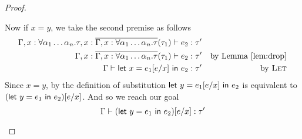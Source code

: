 \begin{proof}
\begin{description}
    Now if $x = y$, we take the second premise as follows
    \begin{align*}
      \Gamma , x : \forall \alpha_1\ldots\alpha_n . \tau , x : \overline{\Gamma, x : \forall\alpha_1\ldots\alpha_n . \tau}(\tau_1)
      \vdash e_2 : \tau' \\
      \Gamma , x : \overline{\Gamma, x : \forall\alpha_1\ldots\alpha_n . \tau}(\tau_1) \vdash e_2 : \tau' &&
                                                                \text{by
                                                                Lemma~\ref{lem:drop}}
      \\
      \Gamma \vdash \mathsf{let} \ x = e_1[e / x] \ \mathsf{in} \ e_2 : \tau' && \text{by \textsc{Let}}
    \end{align*}
    Since $x = y$, by the definition of substitution
    $\mathsf{let} \ y=e_1[e/x] \ \mathsf{in} \ e_2$ is equivalent to $(\mathsf{let} \ y=e_1 \ \mathsf{in} \ e_2)[e/x]$.
    And so we reach our goal
    \[\Gamma \vdash (\mathsf{let} \ y = e_1 \ \mathsf{in} \ e_2)[e/x] : \tau'\]


\end{description}
\end{proof}
